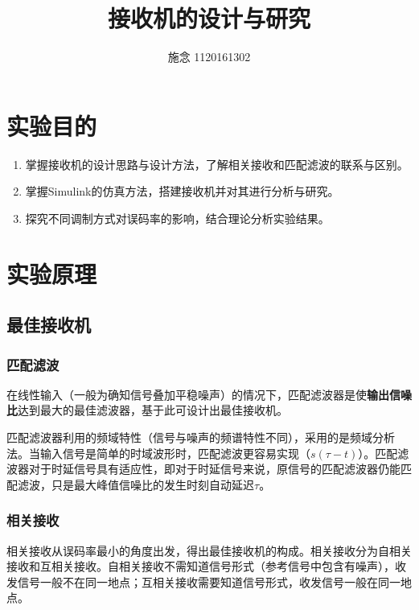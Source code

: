 \documentclass[a4paper]{article}
\begin{document}
\title{接收机的设计与研究}
\author{ 施念 1120161302}
\maketitle{}
\newpage

\begin{center}
\tableofcontents\label{c}
\end{center}
\newpage
\section{实验目的}
\begin{enumerate}[(1) ]
\item
掌握接收机的设计思路与设计方法，了解相关接收和匹配滤波的联系与区别。
\item
掌握Simulink的仿真方法，搭建接收机并对其进行分析与研究。
\item
探究不同调制方式对误码率的影响，结合理论分析实验结果。
\end{enumerate}

\section{实验原理}
\subsection{最佳接收机}
\subsubsection{匹配滤波}
在线性输入（一般为确知信号叠加平稳噪声）的情况下，匹配滤波器是使\textbf{输出信噪比}达到最大的最佳滤波器，基于此可设计出最佳接收机。

匹配滤波器利用的频域特性（信号与噪声的频谱特性不同），采用的是频域分析法。当输入信号是简单的时域波形时，匹配滤波更容易实现（$s(\tau-t)$）。匹配滤波器对于时延信号具有适应性，即对于时延信号来说，原信号的匹配滤波器仍能匹配滤波，只是最大峰值信噪比的发生时刻自动延迟$\tau$。
\subsubsection{相关接收}
相关接收从误码率最小的角度出发，得出最佳接收机的构成。相关接收分为自相关接收和互相关接收。自相关接收不需知道信号形式（参考信号中包含有噪声），收发信号一般不在同一地点；互相关接收需要知道信号形式，收发信号一般在同一地点。
\end{document}
